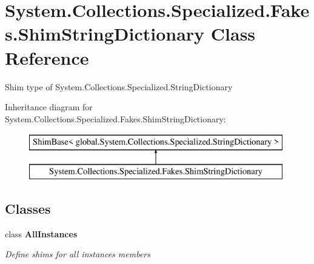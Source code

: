 \hypertarget{class_system_1_1_collections_1_1_specialized_1_1_fakes_1_1_shim_string_dictionary}{\section{System.\-Collections.\-Specialized.\-Fakes.\-Shim\-String\-Dictionary Class Reference}
\label{class_system_1_1_collections_1_1_specialized_1_1_fakes_1_1_shim_string_dictionary}
}


Shim type of System.\-Collections.\-Specialized.\-String\-Dictionary 


Inheritance diagram for System.\-Collections.\-Specialized.\-Fakes.\-Shim\-String\-Dictionary\-:\begin{figure}[H]
\begin{center}
\leavevmode
\includegraphics[height=2.000000cm]{class_system_1_1_collections_1_1_specialized_1_1_fakes_1_1_shim_string_dictionary}
\end{center}
\end{figure}
\subsection*{Classes}
\begin{DoxyCompactItemize}
\item 
class {\bfseries All\-Instances}
\begin{DoxyCompactList}\small\item\em Define shims for all instances members\end{DoxyCompactList}\end{DoxyCompactItemize}
